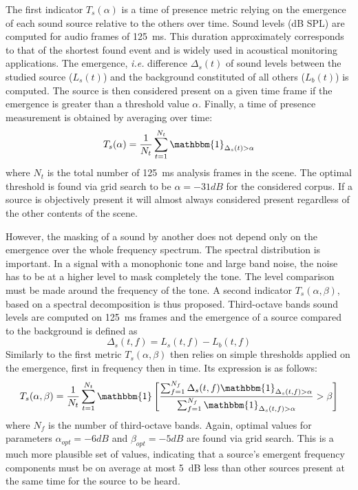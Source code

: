 \documentclass{article}
\begin{document}
\begin{sloppy}
The first indicator $T_s(\alpha)$ is a time of presence metric relying on the emergence of each sound source relative to the others over time. Sound levels (dB SPL) are computed for audio frames of 125~ms. This duration approximately corresponds to that of the shortest found event and is widely used in acoustical monitoring applications. The emergence, \textit{i.e.} difference $\Delta_s(t)$ of sound levels between the studied source ($L_s(t)$) and the background constituted of all others ($L_b(t)$) is computed. The source is then considered present on a given time frame if the emergence is greater than a threshold value $\alpha$. Finally, a time of presence measurement is obtained by averaging over time:
\begin{equation}
T_s(\alpha) = \frac{1}{N_t}\sum_{t = 1}^{N_t}\mathbbm{1}_{\Delta_s(t)>\alpha}
\end{equation}
where $N_t$ is the total number of 125~ms analysis frames in the scene. The optimal threshold is found via grid search to be $\alpha = -31dB$ for the considered corpus. If a source is objectively present it will almost always considered present regardless of the other contents of the scene.

However, the masking of a sound by another does not depend only on the emergence over the whole frequency spectrum. The spectral distribution is important. In a signal with a monophonic tone and large band noise, the noise has to be at a higher level to mask completely the tone. The level comparison must be made around the frequency of the tone. A second indicator $T_s(\alpha, \beta)$, based on a spectral decomposition is thus proposed. Third-octave bands sound levels are computed on 125~ms frames and the emergence of a source compared to the background is defined as
\begin{equation}
\Delta_s(t, f) = L_s(t, f) - L_b(t, f)
\end{equation}
Similarly to the first metric $T_s(\alpha, \beta)$ then relies on simple thresholds applied on the emergence, first in frequency then in time. Its expression is as follows:
\begin{equation}
T_s(\alpha, \beta) = \frac{1}{N_t}\sum_{t = 1}^{N_t}\mathbbm{1}\left[ \frac{\sum_{f = 1}^{N_f}\Delta_s(t, f)\mathbbm{1}_{\Delta_s(t, f)>\alpha}}{\sum_{f = 1}^{N_f}\mathbbm{1}_{\Delta_s(t, f)>\alpha}}>\beta \right]
\end{equation}
where $N_f$ is the number of third-octave bands. Again, optimal values for parameters $\alpha_{opt} = -6 dB$ and $\beta_{opt} = -5 dB$ are found via grid search. This is a much more plausible set of values, indicating that a source's emergent frequency components must be on average at most 5~dB less than other sources present at the same time for the source to be heard.


\end{sloppy}
\end{document}
